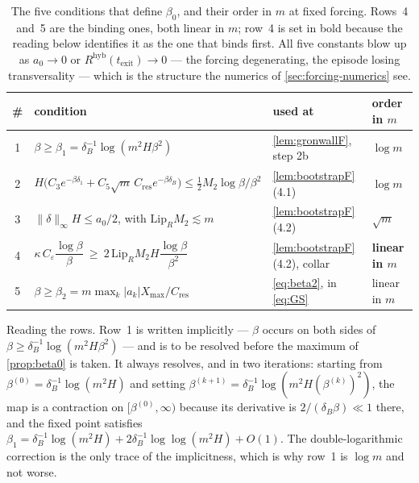 \documentclass[11pt]{article}
\theoremstyle{definition}
\theoremstyle{remark}
\newcommand{\texit}{t_{\mathrm{exit}}}
\newcommand{\hyb}{\mathrm{hyb}}
\begin{document}
\begin{table}[t]
\centering
\caption{The five conditions that define $\beta_0$, and their order in $m$ at
fixed forcing. Rows~4 and~5 are the binding ones, both linear in $m$; row~4 is
set in bold because the reading below identifies it as the one that binds
first. All five constants blow up as
$a_0\to0$ or $R^{\hyb}(\texit)\to0$ --- the forcing degenerating, the episode
losing transversality --- which is the structure the numerics of
\cref{sec:forcing-numerics} see.}
\label{tab:beta0}
\small
\begin{tabular}{@{}clll@{}}
\toprule
\# & condition & used at & order in $m$\\
\midrule
1 & $\beta\ge\beta_1=\delta_B^{-1}\log(m^2H\beta^2)$
  & \cref{lem:gronwallF}, step 2b
  & $\log m$\\
2 & $H\bigl(C_3e^{-\beta\delta_1}+C_5\sqrt m\,C_{\mathrm{res}}e^{-\beta\delta_B}\bigr)
     \le\tfrac12M_2\log\beta/\beta^2$
  & \cref{lem:bootstrapF} (4.1)
  & $\log m$\\
3 & $\|\delta\|_\infty H\le a_0/2$, with $\mathrm{Lip}_R M_2\lesssim m$
  & \cref{lem:bootstrapF} (4.2)
  & $\sqrt m$ \\
4 & $\kappa\,C_\varepsilon\dfrac{\log\beta}{\beta}
     \ \ge\ 2\,\mathrm{Lip}_R M_2 H\dfrac{\log\beta}{\beta^{2}}$
  & \cref{lem:bootstrapF} (4.2), collar
  & \textbf{linear in $m$}\\
5 & $\beta\ge\beta_2=m\max_k|a_k|X_{\max}/C_{\mathrm{res}}$
  & \eqref{eq:beta2}, in \eqref{eq:GS}
  & linear in $m$\\
\bottomrule
\end{tabular}
\end{table}

{\sloppy
\noindent Reading the rows. Row~1 is written implicitly --- $\beta$ occurs on
both sides of $\beta\ge\delta_B^{-1}\log(m^2H\beta^2)$ --- and is to be resolved
before the maximum of \cref{prop:beta0} is taken. It always resolves, and in two
iterations: starting from $\beta^{(0)}=\delta_B^{-1}\log(m^2H)$ and setting
$\beta^{(k+1)}=\delta_B^{-1}\log(m^2H(\beta^{(k)})^2)$, the map is a contraction
on $[\beta^{(0)},\infty)$ because its derivative is $2/(\delta_B\beta)\ll1$
there, and the fixed point satisfies
$\beta_1=\delta_B^{-1}\log(m^2H)+2\delta_B^{-1}\log\log(m^2H)+O(1)$. The
double-logarithmic correction is the only trace of the implicitness, which is
why row~1 is $\log m$ and not worse.
\par}
\end{document}
